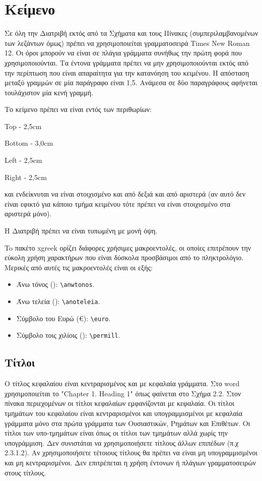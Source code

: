 \section{Κείμενο}
\label{sec:Text}

Σε όλη την Διατριβή εκτός από τα Σχήματα και τους Πίνακες
(συμπεριλαμβανομένων των λεζάντων όμως) πρέπει να χρησιμοποιείται
γραμματοσειρά Times New Roman 12. Οι όροι μπορούν να είναι σε
πλάγια γράμματα συνήθως την πρώτη φορά που χρησιμοποιούνται. Τα
έντονα γράμματα πρέπει να μην χρησιμοποιούνται εκτός από την
περίπτωση που είναι απαραίτητα για την κατανόηση του κειμένου. Η
απόσταση μεταξύ γραμμών σε μία παράγραφο είναι 1,5. Ανάμεσα σε δύο
παραγράφους αφήνεται τουλάχιστον μία κενή γραμμή.

\y Το κείμενο πρέπει να είναι εντός των περιθωρίων:

\chl Top - 2,5cm

\chl Bottom - 3,0cm

\chl Left - 2,5cm

\chl Right - 2,5cm

\chl και ενδείκνυται να είναι στοιχισμένο και από δεξιά και από
αριστερά (αν αυτό δεν είναι εφικτό για κάποιο τμήμα κειμένου τότε
πρέπει να είναι στοιχισμένο στα αριστερά μόνο).

Η Διατριβή πρέπει να είναι τυπωμένη με μονή όψη.

\color{black}
To πακέτο xgreek ορίζει διάφορες χρήσιμες μακροεντολές, οι οποίες επιτρέπουν την εύκολη χρήση χαρακτήρων που είναι δύσκολα προσβάσιμοι από το πληκτρολόγιο.
Μερικές από αυτές τις μακροεντολές είναι οι εξής:
\begin{itemize}
	\item Άνω τόνος (\anwtonos): \verb|\anwtonos|.
	\item Άνω τελεία (\anoteleia): \verb|\anoteleia|.
	\item Σύμβολο του Ευρώ (\euro): \verb|\euro|.
	\item Σύμβολο τοις χιλίοις (\permill): \verb|\permill|.
\end{itemize}


\color{red}
\subsection{Τίτλοι}
\label{subsec:Titles}

Ο τίτλος κεφαλαίου είναι κεντραρισμένος και με κεφαλαία γράμματα.
Στο word χρησιμοποιείται το "Chapter 1. Heading 1" όπως φαίνεται
στο Σχήμα 2.2.  Στον πίνακα περιεχομένων οι τίτλοι κεφαλαίων
εμφανίζονται με κεφαλαία. Οι τίτλοι τμημάτων του κεφαλαίου είναι
κεντραρισμένοι και υπογραμμισμένοι με κεφαλαία γράμματα μόνο στα
πρώτα γράμματα των Ουσιαστικών, Ρημάτων και Επιθέτων. Οι τίτλοι
των υπο-τμημάτων είναι όπως οι τίτλοι των τμημάτων αλλά χωρίς την
υπογράμμιση. Δεν συνιστάται να χρησιμοποιήσετε τίτλους άλλων
επιπέδων (π.χ 2.3.1.2). Αν χρησιμοποιήσετε τέτοιους τίτλους θα
πρέπει να είναι μη υπογραμμισμένοι και μη κεντραρισμένοι. Δεν
επιτρέπεται η χρήση έντονων ή πλάγιων γραμματοσειρών στους
τίτλους.

